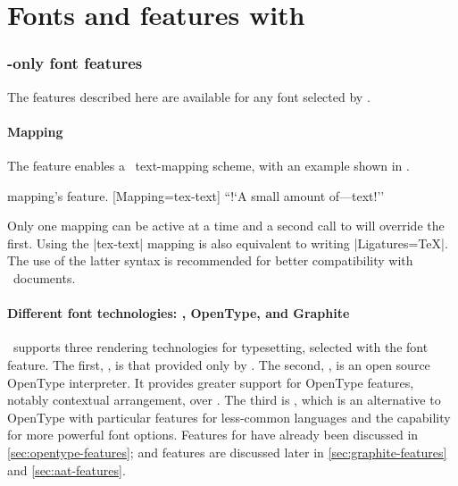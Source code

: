 \documentclass[a4paper]{l3doc}
\begin{document}
\part{Fonts and features with \XeTeX}
\label{sec:xetex-features}

\section{\XeTeX-only font features}

The features described here are available for any font
selected by .

\subsection{Mapping}
\label{sec:mapping}

The  feature enables a \XeTeX\ text-mapping scheme, with an example shown in .

\begin{Xexample}{mapping}{\XeTeX's  feature.}
  [Mapping=tex-text]
  ``!`A small amount of---text!''
\end{Xexample}

Only one mapping can be active at a time and a second call to 
will override the first.
Using the |tex-text| mapping is also equivalent to writing |Ligatures=TeX|.
The use of the latter syntax is recommended for better compatibility with
\LuaTeX\ documents.


\subsection{Different font technologies: \AAT, OpenType, and Graphite}\label{sec:renderer}

\XeTeX\ supports three rendering technologies for typesetting, selected with
the  font feature. The first, , is
that provided only by \MacOSX.
The second, , is an open source OpenType interpreter.
It provides greater support for OpenType features, notably contextual arrangement, over .
The third is , which is an alternative to OpenType with particular features for less-common languages and the capability for more powerful font options.
Features for  have already been discussed in \vref{sec:opentype-features};
 and  features are discussed later in \vref{sec:graphite-features} and \vref{sec:aat-features}.
\end{document}

